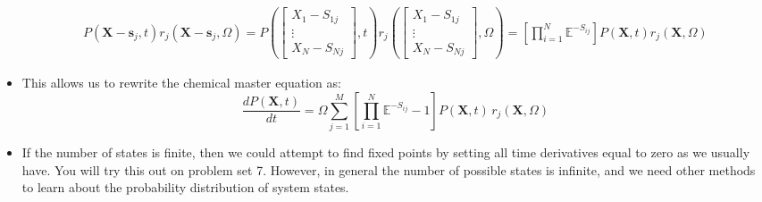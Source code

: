 \documentclass{article}
\begin{document}
\begin{itemize}
\begin{eqnarray*}
P(\mathbf{X}-\mathbf{s}_j,t) r_j(\mathbf{X}-\mathbf{s}_j,\Omega) = P\left( \begin{bmatrix} X_1 - S_{1j}\\ \vdots \\ X_N - S_{Nj} \end{bmatrix}, t \right) r_j\left( \begin{bmatrix} X_1 - S_{1j}\\ \vdots \\ X_N - S_{Nj} \end{bmatrix}, \Omega \right) = \left[ \prod_{i=1}^N \mathbb{E}^{-S_{ij}} \right] P(\mathbf{X},t) r_j(\mathbf{X},\Omega) 
\end{eqnarray*}
\item This allows us to rewrite the chemical master equation as:
\[ \frac{dP(\mathbf{X},t)}{dt} =   \Omega \sum_{j=1}^M \left[ \prod_{i=1}^N \mathbb{E}^{-S_{ij}} - 1 \right]  P(\mathbf{X},t) \, r_j (\mathbf{X}, \Omega)  \]
\item If the number of states is finite, then we could attempt to find fixed points by setting all time derivatives equal to zero as we usually have. You will try this out on problem set 7. However, in general the number of possible states is infinite, and we need other methods to learn about the probability distribution of system states.
\end{itemize}
\end{document}
